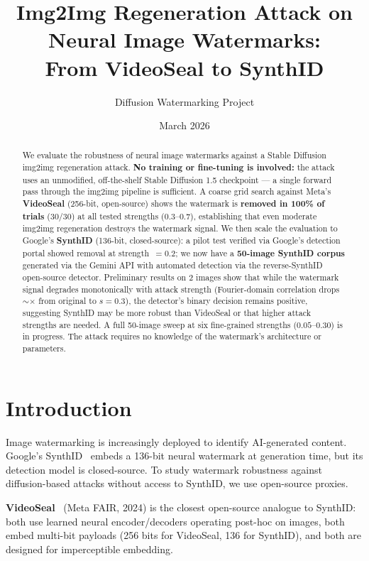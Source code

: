 \documentclass[11pt,a4paper]{article}
\title{Img2Img Regeneration Attack on Neural Image Watermarks:\\
       From VideoSeal to SynthID}
\author{Diffusion Watermarking Project}
\date{March 2026}
\begin{document}
\maketitle

\begin{abstract}
We evaluate the robustness of neural image watermarks against a Stable
Diffusion img2img regeneration attack. \textbf{No training or fine-tuning
is involved:} the attack uses an unmodified, off-the-shelf Stable Diffusion
1.5 checkpoint --- a single forward pass through the img2img pipeline is
sufficient. A coarse grid search against Meta's \textbf{VideoSeal}
(256-bit, open-source) shows the watermark is \textbf{removed in 100\% of
trials} (30/30) at all tested strengths ($0.3$--$0.7$), establishing that
even moderate img2img regeneration destroys the watermark signal. We then
scale the evaluation to Google's \textbf{SynthID} (136-bit, closed-source):
a pilot test verified via Google's detection portal showed removal at
strength~$= 0.2$; we now have a \textbf{50-image SynthID corpus} generated
via the Gemini API with automated detection via the
reverse-SynthID~\cite{reversesynthid} open-source detector. Preliminary
results on 2 images show that while the watermark signal degrades
monotonically with attack strength (Fourier-domain correlation drops
$\sim$$\times$ from original to $s = 0.3$), the detector's binary
decision remains positive, suggesting SynthID may be more robust than
VideoSeal or that higher attack strengths are needed. A full 50-image sweep
at six fine-grained strengths ($0.05$--$0.30$) is in progress. The attack
requires no knowledge of the watermark's architecture or parameters.
\end{abstract}

\section{Introduction}
\label{sec:intro}

Image watermarking is increasingly deployed to identify AI-generated
content. Google's SynthID~\cite{synthid} embeds a 136-bit neural watermark
at generation time, but its detection model is closed-source. To study
watermark robustness against diffusion-based attacks without access to
SynthID, we use open-source proxies.

\textbf{VideoSeal}~\cite{videoseal} (Meta FAIR, 2024) is the closest
open-source analogue to SynthID: both use learned neural
encoder/decoders operating post-hoc on images, both embed multi-bit
payloads (256 bits for VideoSeal, 136 for SynthID), and both are designed
for imperceptible embedding.
\end{document}
